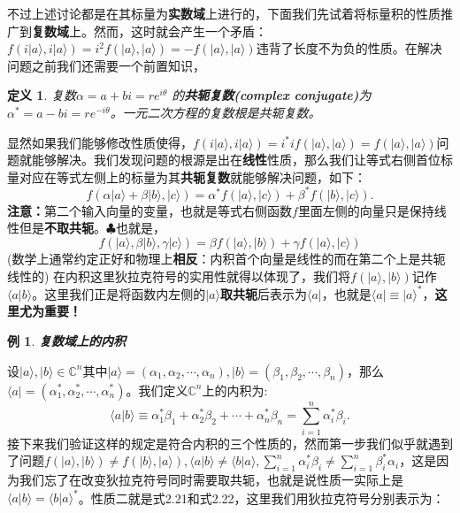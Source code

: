 \documentclass[mathserif,hyperref,UTF8,openany,b5paper]{ctexbook}
\newtheorem{exmp}{例}[section]
\newtheorem{defn}{定义}[section]
\begin{document}
不过上述讨论都是在其标量为\textbf{实数域}上进行的，下面我们先试着将标量积的性质推广到\textbf{复数域}上。然而，这时就会产生一个矛盾：$f(i|a\rangle,i|a\rangle)=i^2f(|a\rangle,|a\rangle)=-f(|a\rangle,|a\rangle)$违背了长度不为负的性质。在解决问题之前我们还需要一个前置知识，
\begin{defn}
复数$\alpha=a+bi = re^{i\theta}$ 的\textbf{共轭复数(complex conjugate)}为$\alpha^*=a-bi= re^{-i\theta}$。一元二次方程的复数根是共轭复数。
\end{defn}
显然如果我们能够修改性质使得，$f(i|a\rangle,i|a\rangle)=i^*if(|a\rangle,|a\rangle)=f(|a\rangle,|a\rangle)$问题就能够解决。我们发现问题的根源是出在\textbf{线性}性质，那么我们让等式右侧首位标量对应在等式左侧上的标量为其\textbf{共轭复数}就能够解决问题，如下：
\begin{equation}
f(\alpha|a\rangle+\beta|b\rangle,|c\rangle)=\alpha^* f(|a\rangle,|c\rangle)+\beta^* f(|b\rangle,|c\rangle).
\end{equation}\textbf{注意：}第二个输入向量的变量，也就是等式右侧函数$f$里面左侧的向量只是保持线性但是\textbf{不取共轭}。$\clubsuit$也就是，\begin{equation}
f(|a\rangle, \beta|b\rangle,\gamma|c\rangle)=\beta f(|a\rangle,|b\rangle)+\gamma f(|a\rangle,|c\rangle)
\end{equation}(数学上通常约定正好和物理上\textbf{相反}：内积首个向量是线性的而在第二个上是共轭线性的) 在内积这里狄拉克符号的实用性就得以体现了，我们将$f(|a\rangle,|b\rangle)$记作$\langle a|b\rangle$。这里我们正是将函数内左侧的$|a\rangle$\textbf{取共轭}后表示为$\langle a|$，也就是$\langle a|\equiv|a\rangle^*$，\textbf{这里尤为重要！}
\begin{exmp}\textbf{复数域上的内积}\end{exmp}
设$|a\rangle,|b\rangle \in \mathbb{C}^n$其中$|a\rangle=(\alpha_1,\alpha_2,\cdots,\alpha_n),|b\rangle=(\beta_1,\beta_2,\cdots,\beta_n)$，那么$\langle a| = (\alpha_1^*,\alpha_2^*,\cdots,\alpha_n^*)$。我们定义$\mathbb{C}^n$上的内积为:
\begin{equation}
    \langle a|b\rangle \equiv \alpha_1^*\beta_1+\alpha_2^*\beta_2+\cdots+\alpha_n^*\beta_n=\sum^n_{i=1}\alpha_i^*\beta_i.
\end{equation}
接下来我们验证这样的规定是符合内积的三个性质的，然而第一步我们似乎就遇到了问题$f(|a\rangle,|b\rangle)\neq f(|b\rangle,|a\rangle), \langle a|b\rangle \neq \langle b|a\rangle,\sum^n_{i=1}\alpha_i^*\beta_i \neq \sum^n_{i=1}\beta_i^*\alpha_i$，这是因为我们忘了在改变狄拉克符号同时需要取共轭，也就是说性质一实际上是$\langle a|b\rangle = \langle b|a\rangle ^*$。性质二就是式2.21和式2.22，这里我们用狄拉克符号分别表示为：
\end{document}
